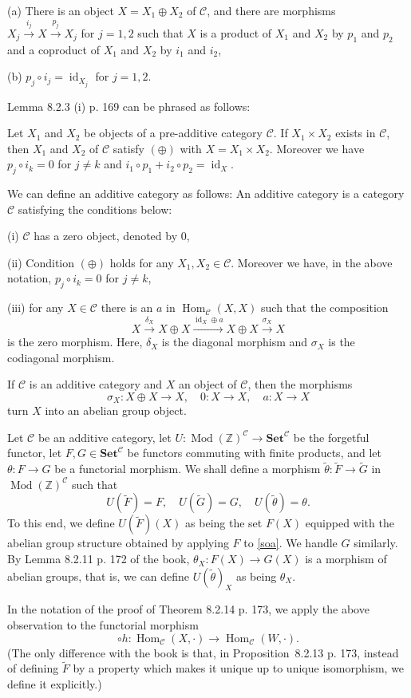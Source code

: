 \documentclass[12pt]{article}
\newcommand{\n}{\noindent}
\newcommand{\C}{\mathcal C}
\newcommand{\Set}{\textbf{Set}}
\newcommand{\xr}{\xrightarrow}
\newcommand{\be}{\begin{equation}}
\newcommand{\ee}{\end{equation}}
\newcommand{\pr}{Proposition}
\DeclareMathOperator{\id}{id}
\DeclareMathOperator{\h}{Hom}
\DeclareMathOperator{\Mod}{Mod}
\begin{document}
\n(a) There is an object $X=X_1\oplus X_2$ of $\C$, and there are morphisms $X_j\xr{i_j}X\xr{p_j}X_j$ for $j=1,2$ such that $X$ is a product of $X_1$ and $X_2$ by $p_1$ and $p_2$ and a coproduct of $X_1$ and $X_2$ by $i_1$ and $i_2$, 

\n(b) $p_j\circ i_j=\id_{X_j}$ for $j=1,2$. 

Lemma 8.2.3 (i) p. 169 can be phrased as follows: 

Let $X_1$ and $X_2$ be objects of a pre-additive category $\C$. If $X_1\times X_2$ exists in $\C$, then $X_1$ and $X_2$ of $\C$ satisfy $(\oplus)$ with $X=X_1\times X_2$. Moreover we have $p_j\circ i_k=0$ for $j\neq k$ and $i_1\circ p_1+i_2\circ p_2=\id_X$. 

We can define an additive category as follows: An additive category is a category $\C$ satisfying the conditions below: 

\n(i) $\C$ has a zero object, denoted by 0, 

\n(ii) Condition $(\oplus)$ holds for any $X_1,X_2\in\C$. Moreover we have, in the above notation, $p_j\circ i_k=0$ for $j\neq k$, 

\n(iii) for any $X\in\C$ there is an $a$ in $\h_\C(X,X)$ such that the composition 
$$ 
X\xr{\delta_X}X\oplus X\xr{\id_X\oplus a}X\oplus X\xr{\sigma_X}X 
$$ 
is the zero morphism. Here, $\delta_X$ is the diagonal morphism and $\sigma_X$ is the codiagonal morphism. 

If $\C$ is an additive category and $X$ an object of $\C$, then the morphisms 
% 
\be\label{soa} 
\sigma_X:X\oplus X\to X,\quad0:X\to X,\quad a:X\to X 
\ee 
%
turn $X$ into an abelian group object. 

Let $\C$ be an additive category, let $U:\Mod(\mathbb Z)^\C\to\Set^\C$ be the forgetful functor, let $F,G\in\Set^\C$ be functors commuting with finite products, and let $\theta:F\to G$ be a functorial morphism. We shall define a morphism $\widetilde\theta:\widetilde F\to\widetilde G$ in $\Mod(\mathbb Z)^\C$ such that 
$$ 
U(\widetilde F)=F,\quad U(\widetilde G)=G,\quad U(\widetilde\theta)=\theta. 
$$ 
To this end, we define $U(\widetilde F)(X)$ as being the set $F(X)$ equipped with the abelian group structure obtained by applying $F$ to \eqref{soa}. We handle $G$ similarly. By Lemma 8.2.11 p. 172 of the book, $\theta_X:F(X)\to G(X)$ is a morphism of abelian groups, that is, we can define $U(\widetilde\theta)_X$ as being $\theta_X$. 

In the notation of the proof of Theorem 8.2.14 p. 173, we apply the above observation to the functorial morphism 
$$ 
\circ h:\h_\C(X,\cdot)\to\h_\C(W,\cdot). 
$$ 
(The only difference with the book is that, in \pr\ 8.2.13 p. 173, instead of defining $\widetilde F$ by a property which makes it unique up to unique isomorphism, we define it explicitly.) 
% 
\end{document}
